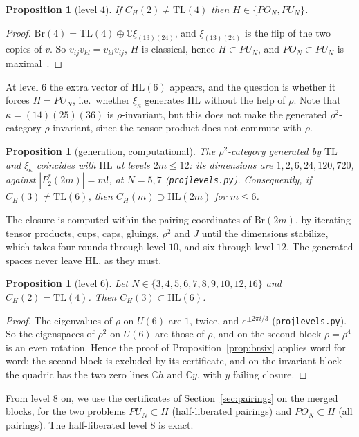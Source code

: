 \documentclass[11pt]{amsart}
\newtheorem{proposition}[theorem]{Proposition}
\theoremstyle{definition}
\theoremstyle{remark}
\theoremstyle{plain}
\numberwithin{equation}{section}
\numberwithin{table}{section}
\newcommand{\C}{\mathbb C}
\newcommand{\TL}{\mathrm{TL}}
\newcommand{\HL}{\mathrm{HL}}
\begin{document}
\begin{proposition}[level $4$]
If $C_H(2)\neq\TL(4)$ then $H\in\{PO_N,PU_N\}$.
\end{proposition}
\begin{proof}
$\mathrm{Br}(4)=\TL(4)\oplus\C\xi_{(13)(24)}$, and $\xi_{(13)(24)}$ is the flip of the two copies of $v$. So $v_{ij}v_{kl}=v_{kl}v_{ij}$, $H$ is classical, hence $H\subset PU_N$, and $PO_N\subset PU_N$ is maximal~\cite{bbcc}.
\end{proof}

At level $6$ the extra vector of $\HL(6)$ appears, and the question is whether it forces $H=PU_N$, i.e.\ whether $\xi_\kappa$ generates $\HL$ without the help of $\rho$. Note that $\kappa=(14)(25)(36)$ is $\rho$-invariant, but this does not make the generated $\rho^2$-category $\rho$-invariant, since the tensor product does not commute with $\rho$.

\begin{proposition}[generation, computational]\label{prop:gen}
The $\rho^2$-category generated by $\TL$ and $\xi_\kappa$ coincides with $\HL$ at levels $2m\le 12$: its dimensions are $1,2,6,24,120,720$, against $|P_2^*(2m)|=m!$, at $N=5,7$ (\texttt{projlevels.py}). Consequently, if $C_H(3)\neq\TL(6)$, then $C_H(m)\supset\HL(2m)$ for $m\le6$.
\end{proposition}

The closure is computed within the pairing coordinates of $\mathrm{Br}(2m)$, by iterating tensor products, cups, caps, gluings, $\rho^2$ and $J$ until the dimensions stabilize, which takes four rounds through level $10$, and six through level $12$. The generated spaces never leave $\HL$, as they must.

\begin{proposition}[level $6$]\label{prop:projsix}
Let $N\in\{3,4,5,6,7,8,9,10,12,16\}$ and $C_H(2)=\TL(4)$. Then $C_H(3)\subset\HL(6)$.
\end{proposition}
\begin{proof}
The eigenvalues of $\rho$ on $U(6)$ are $1$, twice, and $e^{\pm2\pi i/3}$ (\texttt{projlevels.py}). So the eigenspaces of $\rho^2$ on $U(6)$ are those of $\rho$, and on the second block $\rho=\rho^4$ is an even rotation. Hence the proof of Proposition~\ref{prop:brsix} applies word for word: the second block is excluded by its certificate, and on the invariant block the quadric has the two zero lines $\C h$ and $\C y$, with $y$ failing closure.
\end{proof}

From level $8$ on, we use the certificates of Section~\ref{sec:pairings} on the merged blocks, for the two problems $PU_N\subset H$ (half-liberated pairings) and $PO_N\subset H$ (all pairings). The half-liberated level $8$ is exact.
\end{document}
